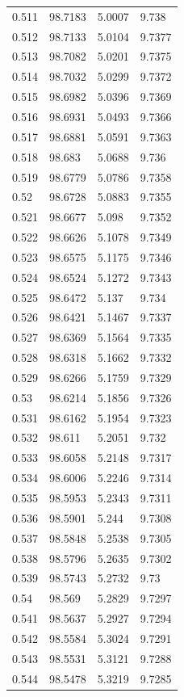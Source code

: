 \begin{tabular}{llll}
0.511 & 98.7183 & 5.0007 & 9.738 \\
0.512 & 98.7133 & 5.0104 & 9.7377 \\
0.513 & 98.7082 & 5.0201 & 9.7375 \\
0.514 & 98.7032 & 5.0299 & 9.7372 \\
0.515 & 98.6982 & 5.0396 & 9.7369 \\
0.516 & 98.6931 & 5.0493 & 9.7366 \\
0.517 & 98.6881 & 5.0591 & 9.7363 \\
0.518 & 98.683 & 5.0688 & 9.736 \\
0.519 & 98.6779 & 5.0786 & 9.7358 \\
0.52 & 98.6728 & 5.0883 & 9.7355 \\
0.521 & 98.6677 & 5.098 & 9.7352 \\
0.522 & 98.6626 & 5.1078 & 9.7349 \\
0.523 & 98.6575 & 5.1175 & 9.7346 \\
0.524 & 98.6524 & 5.1272 & 9.7343 \\
0.525 & 98.6472 & 5.137 & 9.734 \\
0.526 & 98.6421 & 5.1467 & 9.7337 \\
0.527 & 98.6369 & 5.1564 & 9.7335 \\
0.528 & 98.6318 & 5.1662 & 9.7332 \\
0.529 & 98.6266 & 5.1759 & 9.7329 \\
0.53 & 98.6214 & 5.1856 & 9.7326 \\
0.531 & 98.6162 & 5.1954 & 9.7323 \\
0.532 & 98.611 & 5.2051 & 9.732 \\
0.533 & 98.6058 & 5.2148 & 9.7317 \\
0.534 & 98.6006 & 5.2246 & 9.7314 \\
0.535 & 98.5953 & 5.2343 & 9.7311 \\
0.536 & 98.5901 & 5.244 & 9.7308 \\
0.537 & 98.5848 & 5.2538 & 9.7305 \\
0.538 & 98.5796 & 5.2635 & 9.7302 \\
0.539 & 98.5743 & 5.2732 & 9.73 \\
0.54 & 98.569 & 5.2829 & 9.7297 \\
0.541 & 98.5637 & 5.2927 & 9.7294 \\
0.542 & 98.5584 & 5.3024 & 9.7291 \\
0.543 & 98.5531 & 5.3121 & 9.7288 \\
0.544 & 98.5478 & 5.3219 & 9.7285 \\

\end{tabular}

